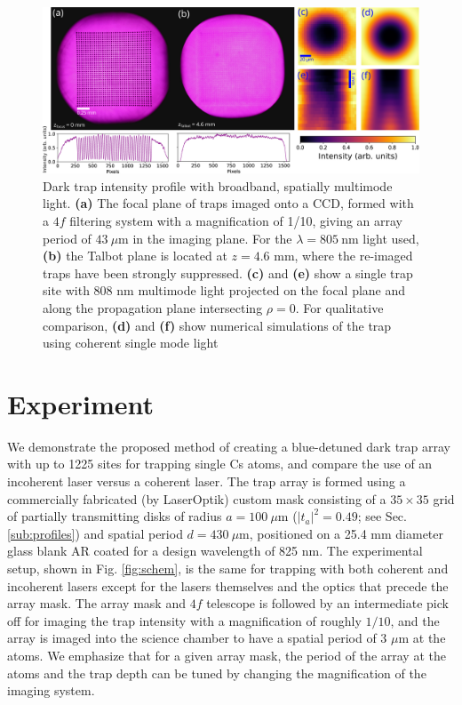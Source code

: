 \begin{figure}[!t]
    \centering
    \includegraphics[width=1\textwidth]{Images/figure3.eps}
    \caption{Dark trap intensity profile with broadband, spatially multimode light. \textbf{(a)} The focal plane of traps imaged onto a CCD, formed with a $4f$ filtering system with a magnification of 1/10, giving an array period of $43~\mu$m in the imaging plane. For the $\lambda= 805~ $nm light used, \textbf{(b)} the Talbot plane is located at $z=4.6$ mm, where the re-imaged traps have been strongly suppressed. \textbf{(c)} and \textbf{(e)} show a single trap site with 808 nm multimode light projected on the focal plane and along the propagation plane intersecting $\rho=0$. For qualitative comparison, \textbf{(d)} and \textbf{(f)} show numerical simulations of the trap using coherent single mode light}
    \label{fig:trap_intensity}
\end{figure}

\section{Experiment} \label{sec:exp}

We demonstrate the proposed method of creating a blue-detuned dark trap array with up to 1225 sites for trapping single Cs atoms, and compare the use of an incoherent laser versus a coherent laser. The trap array is formed using a commercially fabricated (by LaserOptik) custom mask consisting of a $35 \times 35$ grid of partially transmitting disks of radius  $a=100~\mu$m ($|t_a|^2 = 0.49$; see Sec. \ref{sub:profiles}) and spatial period $d=430~\mu \textrm{m}$, positioned on a 25.4 mm diameter glass blank AR coated for a design wavelength of 825 nm. The experimental setup, shown in Fig. \ref{fig:schem}, is the same for trapping with both coherent and incoherent lasers except for the lasers themselves and the optics that precede the array mask. The array mask and $4f$ telescope is followed by an intermediate pick off for imaging the trap intensity with a magnification of roughly $1/10$, and the array is imaged into the science chamber to have a spatial period of 3 $\mu$m at the atoms. We emphasize that for a given array mask, the period of the array at the atoms and the trap depth can be tuned by changing the magnification of the imaging system.

